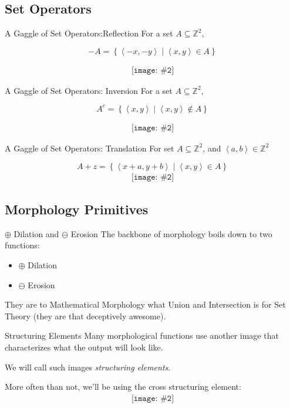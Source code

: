 \documentclass{beamer}
\newcommand{\pic}[2]{
     \begin{array}{l}
      \texttt{[image: \#2]}
      \end{array}
}
\newcommand{\set}[1]{\left\lbrace #1 \right\rbrace}
\newcommand{\buildset}[2]{\set{#1 \mid #2}}
\newcommand{\tuple}[1]{\left\langle #1 \right\rangle}
\newcommand{\integers}{\mathbb{Z}}
\newcommand{\dilate}{\oplus}
\newcommand{\erode}{\ominus}
\begin{document}
\subsection{Set Operators}
\begin{frame}{A Gaggle of Set Operators:Reflection}
  For a set $A \subseteq \integers^2$,

           $$-A = \buildset{\tuple{-x,-y}}
                          {\tuple{x,y} \in A}$$

           $$\pic{width=50pt}{./images/coolhamblen_reflected.png}$$
\end{frame}
%
\begin{frame}{A Gaggle of Set Operators: Inversion}
   For a set $A \subseteq \integers^2$,
          
          $$A^c = \buildset{\tuple{x,y}}
                          {\tuple{x,y}\not\in A}$$

          $$\pic{width=50pt}{./images/coolhamblen_complement.png}$$
\end{frame}
\begin{frame}{A Gaggle of Set Operators: Translation}
  For set $A \subseteq \mathbb{Z}^2$, and $\tuple{a,b} \in \mathbb{Z}^2$


    $$A+z = \buildset{\tuple{x+a,y+b}}
                    {\tuple{x,y} \in A}$$
    $$\pic{width=50pt}{./images/coolhamblen_translated.png}$$
\end{frame} 

\subsection{Morphology Primitives}
\begin{frame}{$\dilate$ Dilation and $\erode$ Erosion}
  The backbone of morphology boils down to two functions:
  \begin{itemize}
    \item $\dilate$ Dilation
    \item $\erode$ Erosion
  \end{itemize}
  They are to Mathematical Morphology what Union and Intersection is for
  Set Theory (they are that deceptively awesome).
\end{frame}

\begin{frame}{Structuring Elements}
  Many morphological functions use another image that characterizes 
  what the output will look like.

  We will call such images \emph{structuring elements}.

  More often than not, we'll be using the cross structuring element:
  $$\pic{width=50pt}{images/cross.png}$$
\end{frame}
\end{document}
